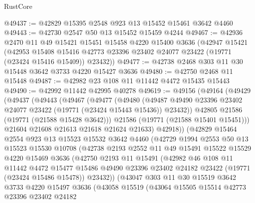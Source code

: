 \begin{lexlean}{RustCore}
\begin{coremodule}
@49437 := @42829 @15395 @2548 @923 @13 @15452 @15461 @3642 @4460
@49443 := @42730 @2547 @50 @13 @15452 @15459 @4244
@49467 := @42936
    @2470
    @11
    @49
    @15421
    @15451
    @15458
    @4220
    @15400
    @3636
    (@42947
      @15421
      (@42953
        @15408
        @15416
        @42773
        @23396
        @23402
        @24077
        @23422
        (@19771 (@23424 @15416 @15409))
        @23432))
@49477 := @42738 @2468 @303 @11 @30 @15448 @3642 @3733 @4220 @15427 @3636
@49480 := @42750 @2468 @11 @15448
@49487 := @42982 @23 @108 @11 @11442 @4472 @15435 @15443
@49490 := @42992 @11442 @42995 @40278
@49619 := @49156
    (@49164
      (@49429
        (@49437
          (@49443
            (@49467
              (@49477
                (@49480
                  (@49487
                    @49490
                    @23396
                    @23402
                    @24077
                    @23422
                    (@19771 (@23424 @15443 @15436))
                    @23432))
                @42805
                @21586
                (@19771 (@21588 @15428 @3642)))
              @21586
              (@19771 (@21588 @15401 @15451)))
            @21604
            @21608
            @21613
            @21618
            @21624
            @21633)
          @42918))
      (@42829
        @15464
        @2554
        @923
        @13
        @15523
        @15532
        @3642
        @4460
        (@42729
          @1994
          @2553
          @50
          @13
          @15523
          @15530
          @10708
          (@42738
            @2193
            @2552
            @11
            @49
            @15491
            @15522
            @15529
            @4220
            @15469
            @3636
            (@42750
              @2193
              @11
              @15491
              (@42982
                @46
                @108
                @11
                @11442
                @4472
                @15477
                @15486
                @49490
                @23396
                @23402
                @24182
                @23422
                (@19771 (@23424 @15486 @15478))
                @23432))
            (@43047
              @303
              @11
              @30
              @15519
              @3642
              @3733
              @4220
              @15497
              @3636
              (@43058
                @15519
                (@43064
                  @15505
                  @15514
                  @42773
                  @23396
                  @23402
                  @24182

\end{coremodule}
\end{lexlean}

